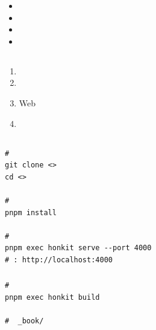 \begin{itemize}
\item
  \important{}
\item
  \important{}
\item
  \important{}
\item
  \important{}
\end{itemize}

\hypertarget{section-12}{%
\subsection{}\label{section-12}}

\begin{enumerate}
\def\labelenumi{\arabic{enumi}.}
\item
  \important{}
\item
  \important{}
\item
  \important{}Web
\item
  \important{}
\end{enumerate}

\hypertarget{section-13}{%
\subsection{}\label{section-13}}

\hypertarget{section-14}{%
\subsubsection{}\label{section-14}}

\hypertarget{section-15}{%
\subsubsection{}\label{section-15}}

\begin{lstlisting}[style=terminal]
# 
git clone <>
cd <>

# 
pnpm install

# 
pnpm exec honkit serve --port 4000
# : http://localhost:4000
\end{lstlisting}

\hypertarget{section-16}{%
\subsubsection{}\label{section-16}}

\begin{lstlisting}[style=terminal]
# 
pnpm exec honkit build

#  _book/ 
\end{lstlisting}

